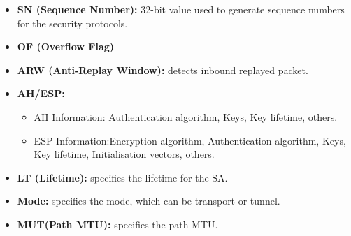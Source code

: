 \documentclass[11pt]{book}
\begin{document}
\begin{itemize}
\item \textbf{SN (Sequence Number):} 32-bit value used to generate sequence numbers for the security protocols.
\item \textbf{OF (Overflow Flag)}
\item\textbf{ ARW (Anti-Replay Window):} detects inbound replayed packet.
\item \textbf{AH/ESP:} 
	\begin{itemize}
	\item AH Information: Authentication algorithm, Keys, Key lifetime, others.
	\item ESP Information:Encryption algorithm, Authentication algorithm, Keys, Key lifetime, Initialisation vectors, others.
	\end{itemize}

\item \textbf{LT (Lifetime):} specifies the lifetime for the SA.
\item \textbf{Mode:} specifies the mode, which can be transport or tunnel.
\item \textbf{MUT(Path MTU):} specifies the path MTU. 
\end{itemize}
\end{document}
